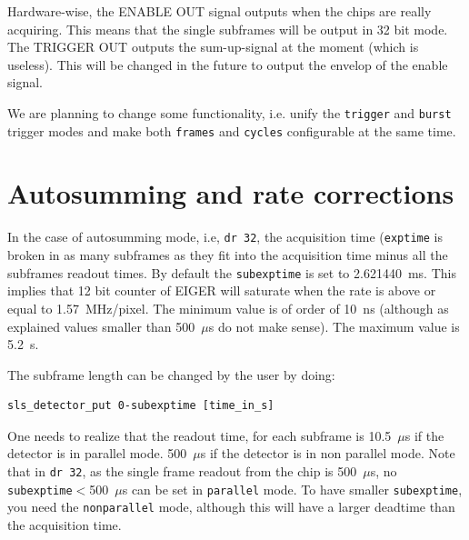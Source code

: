 \documentclass{article}
\newcommand{\E}{EIGER\xspace}
\begin{document}
Hardware-wise, the ENABLE OUT signal outputs when the chips are really acquiring. This means that the single subframes will be output in 32 bit mode. The TRIGGER OUT outputs the sum-up-signal at the moment (which is useless). This will be changed in the future to output the envelop of the enable signal. 

We are planning to change some functionality, i.e. unify the {\tt{trigger}} and {\tt{burst}} trigger modes and make both {\tt{frames}} and {\tt{cycles}} configurable at the same time.

\section{Autosumming and rate corrections} \label{advanced}

In the case of autosumming mode, i.e, {\tt{dr 32}}, the acquisition time ({\tt{exptime}} is broken in as many subframes as they fit into the acquisition time minus all the subframes readout times. By default the {\tt{subexptime}} is set to 2.621440~ms. This implies that 12 bit counter of \E will saturate when the rate is above or equal to 1.57~MHz/pixel. The minimum value is of order of 10~ns (although as explained values smaller than 500~$\mu$s do not make sense). The maximum value is 5.2~s.

The subframe length can be changed by the user by doing: 
\begin{verbatim}
sls_detector_put 0-subexptime [time_in_s] 
\end{verbatim}

One needs to realize that the readout time, for each subframe is 10.5~$\mu$s if the detector is in parallel mode. 500~$\mu$s if the detector is in non parallel mode. Note that in {\tt{dr 32}}, as the single frame readout from the chip is 500~$\mu$s, no {\tt{subexptime}}$<$500~$\mu$s can be set in {\tt{parallel}} mode. To have smaller {\tt{subexptime}}, you need the {\tt{nonparallel}} mode, although this will have a larger deadtime than the acquisition time.\\
\end{document}
